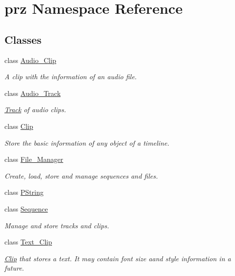 \hypertarget{namespaceprz}{}\section{prz Namespace Reference}
\label{namespaceprz}
\subsection*{Classes}
\begin{DoxyCompactItemize}
\item 
class \mbox{\hyperlink{classprz_1_1_audio___clip}{Audio\+\_\+\+Clip}}
\begin{DoxyCompactList}\small\item\em A clip with the information of an audio file. \end{DoxyCompactList}\item 
class \mbox{\hyperlink{classprz_1_1_audio___track}{Audio\+\_\+\+Track}}
\begin{DoxyCompactList}\small\item\em \mbox{\hyperlink{classprz_1_1_track}{Track}} of audio clips. \end{DoxyCompactList}\item 
class \mbox{\hyperlink{classprz_1_1_clip}{Clip}}
\begin{DoxyCompactList}\small\item\em Store the basic information of any object of a timeline. \end{DoxyCompactList}\item 
class \mbox{\hyperlink{classprz_1_1_file___manager}{File\+\_\+\+Manager}}
\begin{DoxyCompactList}\small\item\em Create, load, store and manage sequences and files. \end{DoxyCompactList}\item 
class \mbox{\hyperlink{classprz_1_1_p_string}{P\+String}}
\item 
class \mbox{\hyperlink{classprz_1_1_sequence}{Sequence}}
\begin{DoxyCompactList}\small\item\em Manage and store tracks and clips. \end{DoxyCompactList}\item 
class \mbox{\hyperlink{classprz_1_1_text___clip}{Text\+\_\+\+Clip}}
\begin{DoxyCompactList}\small\item\em \mbox{\hyperlink{classprz_1_1_clip}{Clip}} that stores a text. It may contain font size aand style information in a future. \end{DoxyCompactList}\item 

\end{DoxyCompactItemize}

